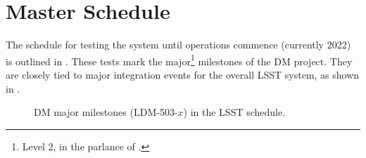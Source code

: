 \section{Master Schedule\label{sect:schedule}}

The schedule for testing the system until operations commence (currently 2022)
is outlined in .
These tests mark the major\footnote{Level 2, in the parlance of .} milestones of the DM project.
They are closely tied to major integration events for the overall LSST system,
as shown in .



\begin{figure}[htbp]

\begin{center}



\end{center}

\caption{DM major milestones (LDM-503-$x$) in the LSST schedule. \label{fig:schedule}}
\end{figure}
